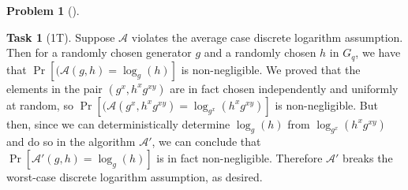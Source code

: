 \documentclass[11pt,twoside]{article}
\theoremstyle{definition}
\newtheorem{amsproblem}{Problem}
\newtheorem{amssubproblem}{Task}[amsproblem]
\newenvironment{problem}[1][]{%
  \begin{amsproblem}[#1]
  }{%
  \end{amsproblem}
}
\newenvironment{subproblem}[1][]{%
  \begin{amssubproblem}[#1]
  }{%
  \end{amssubproblem}
}
\newcommand{\TP}[1]{#1T}
\begin{document}
\begin{problem}
\begin{subproblem}[\TP{1}]
    Suppose $\mathcal{A}$ violates the average case discrete logarithm assumption. Then for a randomly chosen generator $g$ and a randomly chosen $h$ in $G_q$, we have that $\Pr[(\mathcal{A}(g, h) = \log_g (h)]$ is non-negligible. We proved that the elements in the pair $(g^x, h^xg^{xy})$ are in fact chosen independently and uniformly at random, so $\Pr[(\mathcal{A}(g^x,  h^xg^{xy}) = \log_{g^x}(h^xg^{xy})]$ is non-negligible. But then, since we can deterministically determine $\log_g (h)$ from $\log_{g^x}(h^xg^{xy})$ and do so in the algorithm $\mathcal{A}'$, we can conclude that $\Pr[\mathcal{A}'(g, h) = \log_g (h)]$ is in fact non-negligible. Therefore $\mathcal{A}'$ breaks the worst-case discrete logarithm assumption, as desired.

  \end{subproblem}
\end{problem}

\noindent
\hrulefill
\end{document}
